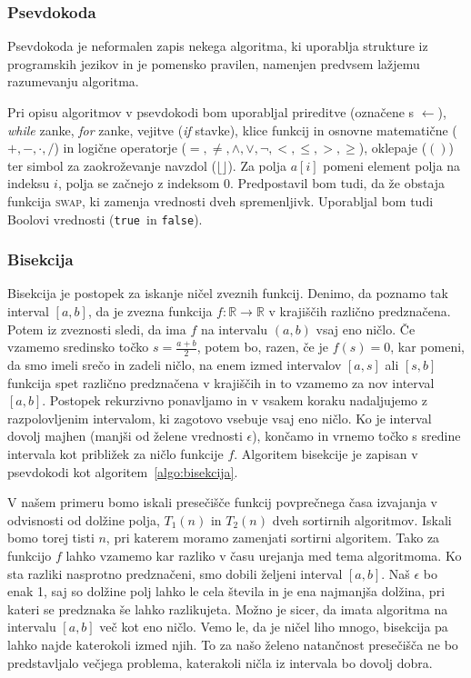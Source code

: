 \documentclass[a4paper,oneside,12pt]{article}
\def\R{\mathbb R}
\def\False{\texttt{false}}
\def\True{\texttt{true}}
\begin{document}
\subsubsection{Psevdokoda}
Psevdokoda je neformalen zapis nekega algoritma, ki uporablja strukture iz programskih
jezikov in je pomensko pravilen, namenjen predvsem lažjemu razumevanju algoritma.

Pri opisu algoritmov v psevdokodi bom uporabljal prireditve (označene s $\gets$), 
\emph{while} zanke, \emph{for} zanke, vejitve (\emph{if} stavke), klice 
funkcij in osnovne  matematične ($+, -, \cdot, /$) in logične operatorje ($=, 
\neq, \wedge, \vee, \neg, <, \leq, >, \geq$), oklepaje ($()$) ter simbol za zaokroževanje
navzdol ($\lfloor\rfloor$). 
Za polja $a[i]$ pomeni element polja na indeksu $i$, polja se začnejo z indeksom $0$.
Predpostavil bom tudi, da že obstaja funkcija \textsc{swap}, ki zamenja vrednosti dveh
spremenljivk. Uporabljal bom tudi Boolovi vrednosti (\True\ in \False).

\subsubsection{Bisekcija}
Bisekcija je postopek za iskanje ničel zveznih funkcij. Denimo, da poznamo tak interval $[a, b]$,
da je zvezna funkcija $f\!\!: \R \rightarrow \R$ v krajiščih različno predznačena.
Potem iz zveznosti sledi, da ima $f$ na
intervalu $(a, b)$ vsaj eno ničlo. Če vzamemo sredinsko točko $s = \frac{a + b}{2}$, potem bo, razen,
če je $f(s) = 0$, kar pomeni, da smo imeli srečo in zadeli ničlo, na enem izmed intervalov $[a, s]$
ali $[s, b]$ funkcija spet različno predznačena v krajiščih in to vzamemo za nov interval $[a, b]$. 
Postopek rekurzivno ponavljamo in v vsakem koraku nadaljujemo z razpolovljenim intervalom,
ki zagotovo vsebuje vsaj eno ničlo. Ko je interval dovolj majhen (manjši od želene vrednosti $\epsilon$), končamo in vrnemo točko s
sredine intervala kot približek za ničlo funkcije $f$. Algoritem bisekcije je zapisan v psevdokodi kot 
algoritem~\ref{algo:bisekcija}.

V našem primeru bomo iskali presečišče funkcij povprečnega časa izvajanja v odvisnosti od dolžine polja, $T_1(n)$ in 
$T_2(n)$ dveh sortirnih algoritmov. Iskali bomo torej tisti $n$, pri katerem moramo zamenjati sortirni algoritem. 
Tako za funkcijo $f$ lahko vzamemo kar razliko v času urejanja med tema algoritmoma.
Ko sta razliki nasprotno predznačeni,
smo dobili željeni interval $[a, b]$. Naš $\epsilon$ bo enak 1, saj so dolžine polj lahko le cela števila
in je ena najmanjša dolžina, pri kateri se predznaka še lahko razlikujeta.
Možno je sicer, da imata algoritma na intervalu $[a, b]$ več kot eno ničlo. 
Vemo le, da je ničel liho mnogo, bisekcija pa lahko najde katerokoli izmed njih.
To za našo želeno natančnost presečišča ne bo predstavljalo večjega problema, katerakoli 
ničla iz intervala bo dovolj dobra.
\end{document}
